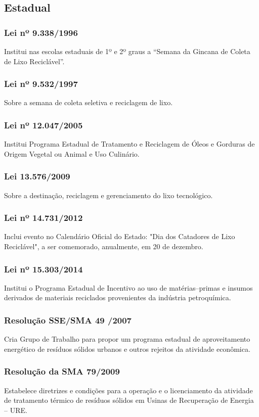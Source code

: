 \begin{subapend}
	\subsection{Estadual}
	\begin{subsubapend}
		\item \subsubsection{Lei nº 9.338/1996}
		Institui nas escolas estaduais de 1º e 2º graus a “Semana da Gincana de Coleta de Lixo Reciclável”.
		\subsubsection{Lei nº 9.532/1997}
		Sobre a semana de coleta seletiva e reciclagem de lixo.
		\subsubsection{Lei nº 12.047/2005}
		Institui Programa Estadual de Tratamento e Reciclagem de Óleos e Gorduras de Origem Vegetal ou Animal e Uso Culinário.
		\subsubsection{Lei 13.576/2009}
		Sobre a destinação, reciclagem e gerenciamento do lixo tecnológico.
		\subsubsection{Lei nº 14.731/2012}
		Inclui evento no Calendário Oficial do Estado: "Dia dos Catadores de Lixo Reciclável", a ser comemorado, anualmente, em 20 de dezembro.
		\subsubsection{Lei nº 15.303/2014}
		Institui o Programa Estadual de Incentivo ao uso de matérias–primas e insumos derivados de materiais reciclados provenientes da indústria petroquímica.
		\subsubsection{Resolução SSE/SMA 49 /2007}
		Cria Grupo de Trabalho para propor um programa estadual de aproveitamento energético de resíduos sólidos urbanos e outros rejeitos da atividade econômica.
		\subsubsection{Resolução da SMA 79/2009}
		Estabelece diretrizes e condições para a operação e o licenciamento da atividade de tratamento térmico de resíduos sólidos em Usinas de Recuperação de Energia – URE.

\end{subsubapend}
\end{subapend}

